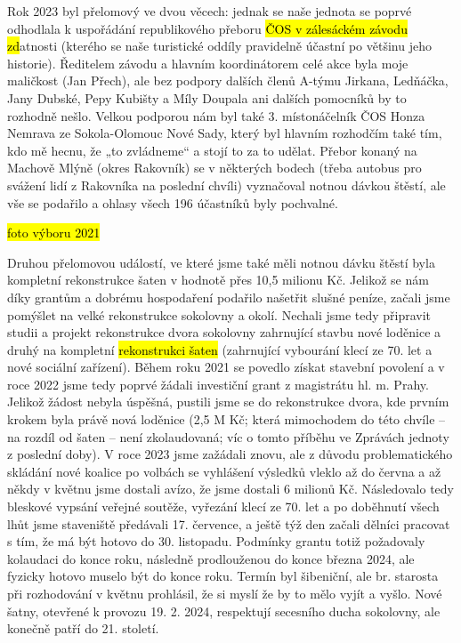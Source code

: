 Rok 2023 byl přelomový ve dvou věcech: jednak se naše jednota se poprvé
odhodlala k uspořádání republikového přeboru \hl{ČOS v zálesáckém závodu
zd}atnosti (kterého se naše turistické oddíly pravidelně účastní po
většinu jeho historie). Ředitelem závodu a hlavním koordinátorem celé
akce byla moje maličkost (Jan Přech), ale bez podpory dalších členů
A-týmu Jirkana, Ledňáčka, Jany Dubské, Pepy Kubišty a Míly Doupala ani
dalších pomocníků by to rozhodně nešlo. Velkou podporou nám byl také 3.
místonáčelník ČOS Honza Nemrava ze Sokola-Olomouc Nové Sady, který byl
hlavním rozhodčím také tím, kdo mě hecnu, že „to zvládneme`` a stojí to
za to udělat. Přebor konaný na Machově Mlýně (okres Rakovník) se v
některých bodech (třeba autobus pro svážení lidí z Rakovníka na poslední
chvíli) vyznačoval notnou dávkou štěstí, ale vše se podařilo a ohlasy
všech 196 účastníků byly pochvalné.

\hl{foto výboru 2021}

Druhou přelomovou událostí, ve které jsme také měli notnou dávku štěstí
byla kompletní rekonstrukce šaten v hodnotě přes 10,5 milionu Kč.
Jelikož se nám díky grantům a dobrému hospodaření podařilo našetřit
slušné peníze, začali jsme pomýšlet na velké rekonstrukce sokolovny a
okolí. Nechali jsme tedy připravit studii a projekt rekonstrukce dvora
sokolovny zahrnující stavbu nové loděnice a druhý na kompletní
\hl{rekonstrukci šaten} (zahrnující vybourání klecí ze 70. let a nové
sociální zařízení). Během roku 2021 se povedlo získat stavební povolení
a v roce 2022 jsme tedy poprvé žádali investiční grant z magistrátu hl.
m. Prahy. Jelikož žádost nebyla úspěšná, pustili jsme se do rekonstrukce
dvora, kde prvním krokem byla právě nová loděnice (2,5 M Kč; která
mimochodem do této chvíle -- na rozdíl od šaten -- není zkolaudovaná;
víc o tomto příběhu ve Zprávách jednoty z poslední doby). V roce 2023
jsme zažádali znovu, ale z důvodu problematického skládání nové koalice
po volbách se vyhlášení výsledků vleklo až do června a až někdy v květnu
jsme dostali avízo, že jsme dostali 6 milionů Kč. Následovalo tedy
bleskové vypsání veřejné soutěže, vyřezání klecí ze 70. let a po
doběhnutí všech lhůt jsme staveniště předávali 17. července, a ještě týž
den začali dělníci pracovat s tím, že má být hotovo do 30. listopadu.
Podmínky grantu totiž požadovaly kolaudaci do konce roku, následně
prodlouženou do konce března 2024, ale fyzicky hotovo muselo být do
konce roku. Termín byl šibeniční, ale br. starosta při rozhodování v
květnu prohlásil, že si myslí že by to mělo vyjít a vyšlo. Nové šatny,
otevřené k provozu 19. 2. 2024, respektují secesního ducha sokolovny,
ale konečně patří do 21. století.

